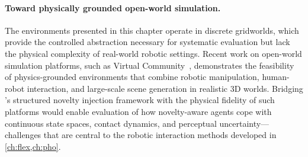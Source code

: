 \paragraph{Toward physically grounded open-world simulation.} The environments presented in this chapter operate in discrete gridworlds, which provide the controlled abstraction necessary for systematic evaluation but lack the physical complexity of real-world robotic settings. Recent work on open-world simulation platforms, such as Virtual Community~\citep{zhou2025virtual}, demonstrates the feasibility of physics-grounded environments that combine robotic manipulation, human-robot interaction, and large-scale scene generation in realistic 3D worlds. Bridging \NovelGym{}'s structured novelty injection framework with the physical fidelity of such platforms would enable evaluation of how novelty-aware agents cope with continuous state spaces, contact dynamics, and perceptual uncertainty---challenges that are central to the robotic interaction methods developed in \cref{ch:flex,ch:pho}.
